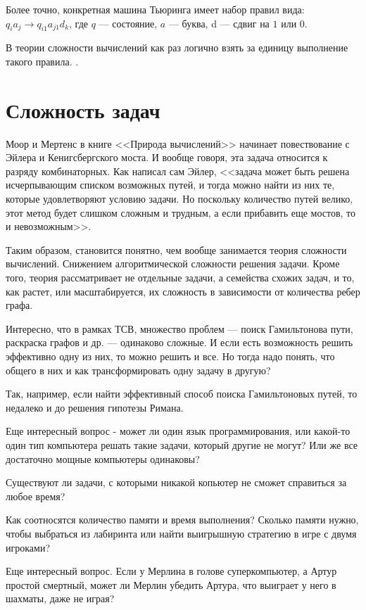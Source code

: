 \documentclass{article}
\begin{document}
Более точно, конкретная машина Тьюринга имеет набор правил вида: 
${q_i}{a_j}\to {q_{i1}}{a_{j1}}{d_k}$, 
где $q$ --- состояние, $a$ --- буква, d --- сдвиг на $1$ или $0$.

В теории сложности вычислений как раз логично взять за единицу выполнение такого правила.
\cite{wikituring}.

\section{Сложность задач}
Моор и Мертенс в книге <<Природа вычислений>>\cite{moor} начинает повествование с Эйлера и Кенигсбергского моста.
И вообще говоря, эта задача относится к разряду комбинаторных. Как написал сам Эйлер, <<задача может быть решена исчерпывающим списком возможных путей, и тогда можно найти из них те, которые удовлетворяют условию задачи. Но поскольку количество путей велико, этот метод будет слишком сложным и трудным, а если прибавить еще мостов, то и невозможным>>.

Таким образом, становится понятно, чем вообще занимается теория сложности вычислений. Снижением алгоритмической сложности решения задачи. Кроме того, теория рассматривает не отдельные задачи, а семейства схожих задач, и то, как растет, или масштабируется, их сложность  в зависимости от количества ребер графа.

Интересно, что в рамках ТСВ, множество проблем --- поиск Гамильтонова пути, раскраска графов и др. --- одинаково сложные. И если есть возможность решить эффективно одну из них, то можно решить и все. Но тогда надо понять, что общего в них и как трансформировать одну задачу в другую?

Так, например, если найти эффективный способ поиска Гамильтоновых путей, то недалеко и до решения гипотезы Римана.

Еще интересный вопрос - может ли один язык программирования, или какой-то один тип компьютера решать такие задачи, который другие не могут? Или же все достаточно мощные компьютеры одинаковы? 

Существуют ли задачи, с которыми никакой копьютер не сможет справиться за любое время?

Как соотносятся количество памяти и время выполнения? Сколько памяти нужно, чтобы выбраться из лабиринта или найти выигрышную стратегию в игре с двумя игроками?

Еще интересный вопрос. Если у Мерлина в голове суперкомпьютер, а Артур простой смертный, может ли Мерлин убедить Артура, что выиграет у него в шахматы, даже не играя?
\end{document}
